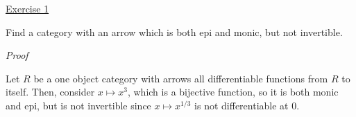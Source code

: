 \noindent
\underline{Exercise 1}
\vspace{2mm}

Find a category with an arrow which is both epi and monic, but not invertible.

\vspace{2mm}

\noindent
\emph{Proof}

Let $R$ be a one object category with arrows all differentiable functions from $R$ to itself. Then, consider $x \mapsto x^3$, which is a bijective function, so it is both monic and epi, but is not invertible since $x \mapsto x^{1/3}$ is not differentiable at $0$.

\vspace{2mm}
